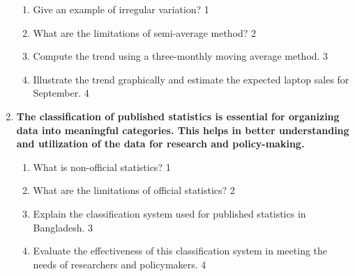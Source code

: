 \documentclass[12pt]{article}
\begin{document}
\begin{enumerate}
\begin{enumerate}
 \item Give an example of irregular variation? \hfill 1
 \item What are the limitations of semi-average method? \hfill 2
  \item  
  Compute the trend using a three-monthly moving average method. \hfill 3
  \item
  Illustrate the trend graphically and estimate the expected laptop sales for September. \hfill 4
\end{enumerate}

\item
\textbf{The classification of published statistics is essential for organizing data into meaningful categories. This helps in better understanding and utilization of the data for research and policy-making.}

\begin{enumerate}
 \item What is non-official statistics?  \hfill 1
  \item What are the limitations of official statistics? \hfill 2
    \item  
    Explain the classification system used for published statistics in Bangladesh. \hfill 3
    \item
    Evaluate the effectiveness of this classification system in meeting the needs of researchers and policymakers. \hfill 4
\end{enumerate}
  
\end{enumerate}

 \vspace{2.5cm}

\end{document}
